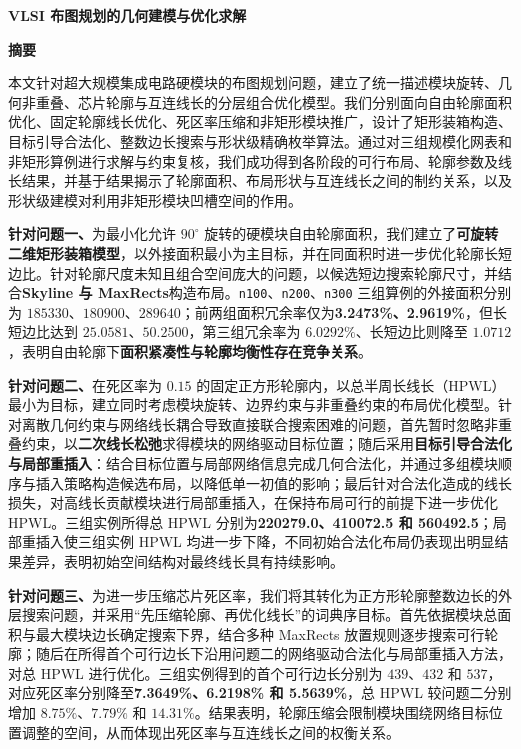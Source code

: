 \documentclass[fontset=windows,a4paper]{ctexart}
\begin{document}
\setcounter{page}{1}

\begin{center}
  \vspace*{0.2cm}
  {\Large\bfseries VLSI 布图规划的几何建模与优化求解}
  \vspace*{1cm}

  {\Large\bfseries 摘\quad 要}
\end{center}
\thispagestyle{fancy}

本文针对超大规模集成电路硬模块的布图规划问题，建立了统一描述模块旋转、几何非重叠、芯片轮廓与互连线长的分层组合优化模型。我们分别面向自由轮廓面积优化、固定轮廓线长优化、死区率压缩和非矩形模块推广，设计了矩形装箱构造、目标引导合法化、整数边长搜索与形状级精确枚举算法。通过对三组规模化网表和非矩形算例进行求解与约束复核，我们成功得到各阶段的可行布局、轮廓参数及线长结果，并基于结果揭示了轮廓面积、布局形状与互连线长之间的制约关系，以及形状级建模对利用非矩形模块凹槽空间的作用。

\noindent\textbf{针对问题一、}为最小化允许 $90^\circ$ 旋转的硬模块自由轮廓面积，我们建立了\textbf{可旋转二维矩形装箱模型}，以外接面积最小为主目标，并在同面积时进一步优化轮廓长短边比。针对轮廓尺度未知且组合空间庞大的问题，以候选短边搜索轮廓尺寸，并结合\textbf{Skyline 与 MaxRects}构造布局。\texttt{n100}、\texttt{n200}、\texttt{n300} 三组算例的外接面积分别为 $185330$、$180900$、$289640$；前两组面积冗余率仅为\textbf{3.2473\%、2.9619\%}，但长短边比达到 $25.0581$、$50.2500$，第三组冗余率为 $6.0292\%$、长短边比则降至 $1.0712$，表明自由轮廓下\textbf{面积紧凑性与轮廓均衡性存在竞争关系}。

\noindent\textbf{针对问题二、}在死区率为 $0.15$ 的固定正方形轮廓内，以总半周长线长（HPWL）最小为目标，建立同时考虑模块旋转、边界约束与非重叠约束的布局优化模型。针对离散几何约束与网络线长耦合导致直接联合搜索困难的问题，首先暂时忽略非重叠约束，以\textbf{二次线长松弛}求得模块的网络驱动目标位置；随后采用\textbf{目标引导合法化与局部重插入}：结合目标位置与局部网络信息完成几何合法化，并通过多组模块顺序与插入策略构造候选布局，以降低单一初值的影响；最后针对合法化造成的线长损失，对高线长贡献模块进行局部重插入，在保持布局可行的前提下进一步优化 HPWL。三组实例所得总 HPWL 分别为\textbf{220279.0、410072.5 和 560492.5}；局部重插入使三组实例 HPWL 均进一步下降，不同初始合法化布局仍表现出明显结果差异，表明初始空间结构对最终线长具有持续影响。

\noindent\textbf{针对问题三、}为进一步压缩芯片死区率，我们将其转化为正方形轮廓整数边长的外层搜索问题，并采用“先压缩轮廓、再优化线长”的词典序目标。首先依据模块总面积与最大模块边长确定搜索下界，结合多种 MaxRects 放置规则逐步搜索可行轮廓；随后在所得首个可行边长下沿用问题二的网络驱动合法化与局部重插入方法，对总 HPWL 进行优化。三组实例得到的首个可行边长分别为 $439$、$432$ 和 $537$，对应死区率分别降至\textbf{7.3649\%、6.2198\% 和 5.5639\%}，总 HPWL 较问题二分别增加 $8.75\%$、$7.79\%$ 和 $14.31\%$。结果表明，轮廓压缩会限制模块围绕网络目标位置调整的空间，从而体现出死区率与互连线长之间的权衡关系。
\end{document}

